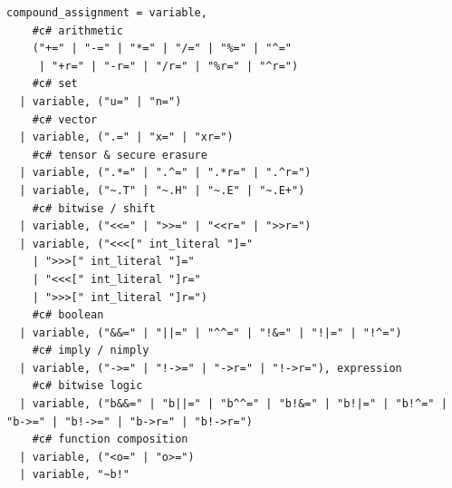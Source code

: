 \begin{verbatim}
compound_assignment = variable,
    #c# arithmetic
    ("+=" | "-=" | "*=" | "/=" | "%=" | "^=" 
     | "+r=" | "-r=" | "/r=" | "%r=" | "^r=")
    #c# set
  | variable, ("u=" | "n=")
    #c# vector
  | variable, (".=" | "x=" | "xr=")
    #c# tensor & secure erasure
  | variable, (".*=" | ".^=" | ".*r=" | ".^r=")
  | variable, ("~.T" | "~.H" | "~.E" | "~.E+")
    #c# bitwise / shift
  | variable, ("<<=" | ">>=" | "<<r=" | ">>r=")
  | variable, ("<<<[" int_literal "]=" 
    | ">>>[" int_literal "]=" 
    | "<<<[" int_literal "]r=" 
    | ">>>[" int_literal "]r=")
    #c# boolean
  | variable, ("&&=" | "||=" | "^^=" | "!&=" | "!|=" | "!^=")
    #c# imply / nimply
  | variable, ("->=" | "!->=" | "->r=" | "!->r="), expression
    #c# bitwise logic
  | variable, ("b&&=" | "b||=" | "b^^=" | "b!&=" | "b!|=" | "b!^=" | "b->=" | "b!->=" | "b->r=" | "b!->r=")
    #c# function composition
  | variable, ("<o=" | "o>=")
  | variable, "~b!"
\end{verbatim}

